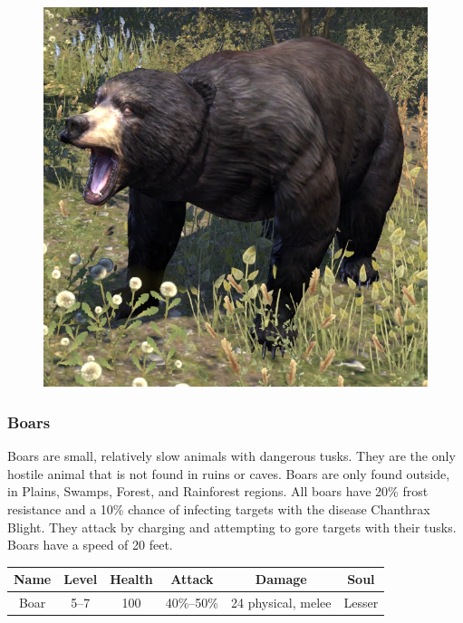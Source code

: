 \documentclass[12pt]{book}
\begin{document}
\begin{figure}[h]
	\centering
	\includegraphics[scale=0.5]{bear.png}
\end{figure}

\subsubsection{Boars}
Boars are small, relatively slow animals with dangerous tusks. They are the only hostile animal that is not found in ruins or caves. Boars are only found outside, in Plains, Swamps, Forest, and Rainforest regions. All boars have 20\% frost resistance and a 10\% chance of infecting targets with the disease Chanthrax Blight. They attack by charging and attempting to gore targets with their tusks. Boars have a speed of 20 feet.\\

\begin{tabular}{|c|c|c|c|c|c|}
\hline
Name & Level & Health & Attack & Damage & Soul\\ \hline
Boar & 5--7 & 100 & 40\%--50\% & 24 physical, melee & Lesser\\ \hline
\end{tabular}\\
\end{document}
